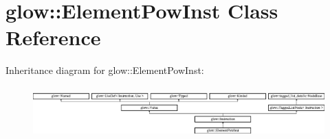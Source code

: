 \hypertarget{classglow_1_1_element_pow_inst}{}\section{glow\+:\+:Element\+Pow\+Inst Class Reference}
\label{classglow_1_1_element_pow_inst}
Inheritance diagram for glow\+:\+:Element\+Pow\+Inst\+:\begin{figure}[H]
\begin{center}
\leavevmode
\includegraphics[height=1.991111cm]{classglow_1_1_element_pow_inst}
\end{center}
\end{figure}

